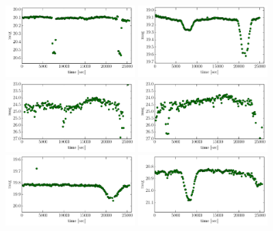 \documentclass[iop, apj]{emulateapj}
\newcommand{\?}{\stackrel{?}{=}}
\begin{document}
\begin{figure}[htbp]
\centering
\includegraphics[width=5cm,clip,angle=90]{pic/eclipse/cand_1.pdf}
\includegraphics[width=5cm,clip,angle=90]{pic/eclipse/cand_2.pdf}
\includegraphics[width=5cm,clip,angle=90]{pic/eclipse/cand_3.pdf}
\includegraphics[width=5cm,clip,angle=90]{pic/eclipse/cand_4.pdf}
\includegraphics[width=5cm,clip,angle=90]{pic/eclipse/cand_5.pdf}
\includegraphics[width=5cm,clip,angle=90]{pic/eclipse/cand_6.pdf}

\end{figure}
\end{document}
